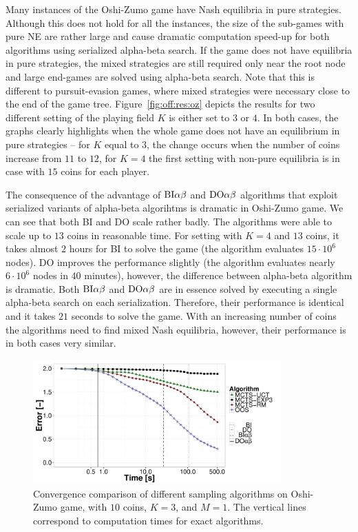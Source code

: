 Many instances of the Oshi-Zumo game have Nash equilibria in pure strategies. 
Although this does not hold for all the instances, the size of the sub-games with pure NE are rather large and cause dramatic computation speed-up for both algorithms using serialized alpha-beta search.
If the game does not have equilibria in pure strategies, the mixed strategies are still required only near the root node and large end-games are solved using alpha-beta search.
Note that this is different to pursuit-evasion games, where mixed strategies were necessary close to the end of the game tree.
Figure~\ref{fig:off:res:oz} depicts the results for two different setting of the playing field $K$ is either set to $3$ or $4$.
In both cases, the graphs clearly highlights when the whole game does not have an equilibrium in pure strategies -- for $K$ equal to $3$, the change occurs when the number of coins increase from $11$ to $12$, for $K=4$ the first setting with non-pure equilibria is in case with $15$ coins for each player.

The consequence of the advantage of $\textrm{BI}\alpha\beta$ and $\textrm{DO}\alpha\beta$ algorithms that exploit serialized variants of alpha-beta algorihtms is dramatic in Oshi-Zumo game. 
We can see that both \textsc{BI} and \textsc{DO} scale rather badly.
The algorithms were able to scale up to $13$ coins in reasonable time. 
For setting with $K=4$ and $13$ coins, it takes almost $2$ hours for \textsc{BI} to solve the game (the algorithm evaluates $15\cdot10^6$ nodes).
\textsc{DO} improves the performance slightly (the algorithm evaluates nearly $6\cdot10^6$ nodes in $40$ minutes), however, the difference between alpha-beta algorithm is dramatic. 
Both $\textrm{BI}\alpha\beta$ and $\textrm{DO}\alpha\beta$ are in essence solved by executing a single alpha-beta search on each serialization.
Therefore, their performance is identical and it takes $21$ seconds to solve the game.
With an increasing number of coins the algorithms need to find mixed Nash equilibria, however, their performance is in both cases very similar.

\begin{figure}
\centering
\includegraphics[width=0.85\textwidth]{figures/convergence-oz.pdf}
\caption{Convergence comparison of different sampling algorithms on Oshi-Zumo game, with $10$ coins, $K=3$, and $M=1$. The vertical lines correspond to computation times for exact algorithms.} \label{fig:off:conv:oz}
\end{figure}

